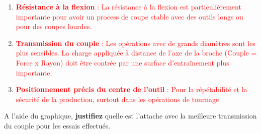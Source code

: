 \documentclass[12pt,a4paper]{article} %
\begin{document}
\begin{enumerate}[1)]
    \item \textcolor{red}{\textbf{Résistance à la flexion} : La résistance à la flexion est particulièrement importante pour avoir un process de coupe stable avec des outils longs ou pour des coupes lourdes.}
    \item \textcolor{red}{\textbf{Transmission du couple} : Les opérations avec de grands diamètres sont les plus sensibles. La charge appliquée à distance de l'axe de la broche (Couple = Force x Rayon) doit être contrée par une surface d'entraînement plus importante.}
    \item \textcolor{red}{\textbf{Positionnement précis du centre de l'outil} : Pour la répétabilité et la sécurité de la production, surtout dans les opérations de tournage}
\end{enumerate}


\newpage

\begin{exo} A l’aide du graphique, \textbf{justifiez} quelle est l’attache avec la meilleure transmission du couple pour les essais effectués. \end{exo}
\end{document}
